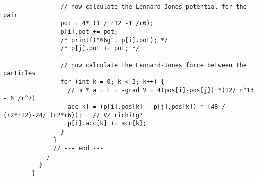 \begin{lstlisting}
                // now calculate the Lennard-Jones potential for the pair
                pot = 4* (1 / r12 -1 /r6);
                p[i].pot += pot;
                /* printf("%6g", p[i].pot); */
                /* p[j].pot += pot; */
        
                // now calculate the Lennard-Jones force between the particles
                for (int k = 0; k < 3; k++) {
                  // m * a = F = -grad V = 4(pos[i]-pos[j]) *(12/ r^13 - 6 /r^7)
                  acc[k] = (p[i].pos[k] - p[j].pos[k]) * (48 / (r2*r12)-24/ (r2*r6));   // VZ richitg?
                  p[i].acc[k] += acc[k];
                }
              }
              // --- end ---
            }
          }
        }\end{lstlisting}

